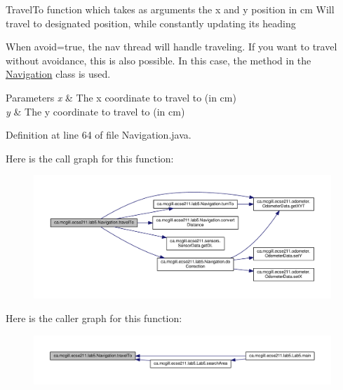 Travel\+To function which takes as arguments the x and y position in cm Will travel to designated position, while constantly updating it\textquotesingle{}s heading

When avoid=true, the nav thread will handle traveling. If you want to travel without avoidance, this is also possible. In this case, the method in the \hyperlink{classca_1_1mcgill_1_1ecse211_1_1lab5_1_1_navigation}{Navigation} class is used.


\begin{DoxyParams}{Parameters}
{\em x} & The x coordinate to travel to (in cm) \\
\hline
{\em y} & The y coordinate to travel to (in cm) \\
\hline
\end{DoxyParams}


Definition at line 64 of file Navigation.\+java.

Here is the call graph for this function\+:
\nopagebreak
\begin{figure}[H]
\begin{center}
\leavevmode
\includegraphics[width=350pt]{classca_1_1mcgill_1_1ecse211_1_1lab5_1_1_navigation_a318969f4776d0bf4a8721be3d2444a5c_cgraph}
\end{center}
\end{figure}
Here is the caller graph for this function\+:
\nopagebreak
\begin{figure}[H]
\begin{center}
\leavevmode
\includegraphics[width=350pt]{classca_1_1mcgill_1_1ecse211_1_1lab5_1_1_navigation_a318969f4776d0bf4a8721be3d2444a5c_icgraph}
\end{center}
\end{figure}
\mbox{\label{classca_1_1mcgill_1_1ecse211_1_1lab5_1_1_navigation_a2b39928c8062fe6863de8e818d009e91}} 
